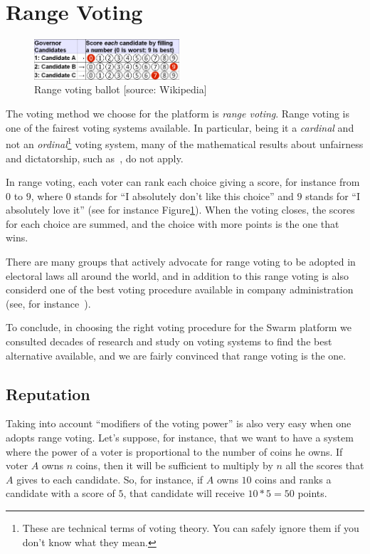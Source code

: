 \documentclass[submission, copyright,creativecommons,sharealike,noncommercial]{eptcs}
\begin{document}
\section{Range Voting}\label{sec:Range voting}
	\begin{figure}
		\vspace{-10pt}
		\begin{center}
			\includegraphics[width=0.48\textwidth]{Voting_Ballot.png}
		\end{center}
		\vspace{-15pt}
		\caption{Range voting ballot [source: Wikipedia]}\label{fig:Ballot}
		\vspace{-5pt}
	\end{figure}
%
	The voting method we choose for the platform is \emph{range voting}. Range voting is one of the fairest voting systems available. In particular, being it a \emph{cardinal} and not an \emph{ordinal}\footnote{These are technical terms of voting theory. You can safely ignore them if you don't know what they mean.} voting system, many of the mathematical results about unfairness and dictatorship, such as~\cite{Arrow1951, Satterthwaite1975}, do not apply.
	
	In range voting, each voter can rank each choice giving a score, for instance from $0$ to $9$, where $0$ stands for ``I absolutely don't like this choice'' and $9$ stands for ``I absolutely love it'' (see for instance Figure\ref{fig:Ballot}). When the voting closes, the scores for each choice are summed, and the choice with more points is the one that wins.
	
	There are many groups that actively advocate for range voting to be adopted in electoral laws all around the world, and in addition to this range voting is also considerd one of the best voting procedure available in company administration (see, for instance~\cite{Electology, RangeVoting}). 
	
	To conclude, in choosing the right voting procedure for the Swarm platform we consulted decades of research and study on voting systems to find the best alternative available, and we are fairly convinced that range voting is the one.
%
%	
\subsection{Reputation}\label{subsec:Reputation}
%
	Taking into account ``modifiers of the voting power'' is also very easy when one adopts range voting. Let's suppose, for instance, that we want to have a system where the power of a voter is proportional to the number of coins he owns. If voter $A$ owns $n$ coins, then it will be sufficient to multiply by $n$ all the scores that $A$ gives to each candidate. So, for instance, if $A$ owns $10$ coins and ranks a candidate with a score of $5$, that candidate will receive $10*5=50$ points.
	
\end{document}
